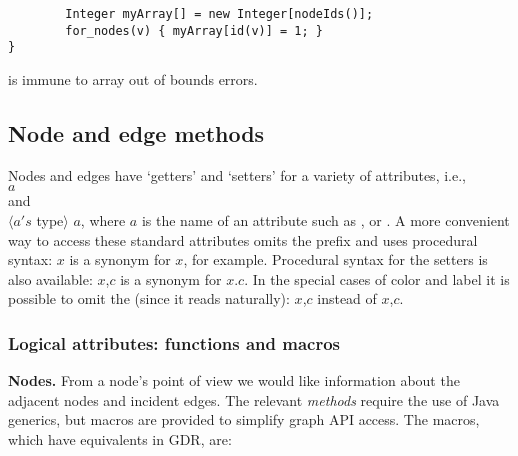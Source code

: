 \begin{minipage}{0.8\textwidth}
\begin{verbatim}
        Integer myArray[] = new Integer[nodeIds()];
        for_nodes(v) { myArray[id(v)] = 1; }
}
\end{verbatim}
\end{minipage}

is immune to array out of bounds errors.

\subsection{Node and edge methods}

Nodes and edges have `getters' and `setters' for
a variety of attributes, i.e.,
\\
$a$
\\
and
\\
$\langle a's$ type$\rangle$ $a$\Code{()},
where $a$ is the name of an attribute such as
,
 or .
A more convenient way to access these standard attributes omits the prefix 
and uses procedural syntax:
$x$\Code{)} is a synonym for $x$, for example.
Procedural syntax for the setters is also available:
$x$,$c$\Code{)} is a synonym for $x$.$c$\Code{)}.
In the special cases of color and label it is possible to omit the 
(since it reads naturally): $x$,$c$\Code{)} instead of $x$,$c$\Code{)}.

\subsubsection{Logical attributes: functions and macros}

\textbf{Nodes.}
From a node's point of view we would like information about the adjacent nodes and incident edges.
The relevant \emph{methods} require the use of Java generics, but macros are provided
to simplify graph API access. The macros, which have equivalents in GDR, are:

